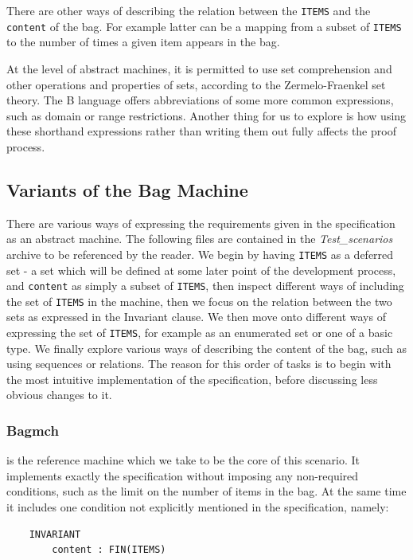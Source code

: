 \documentclass[11pt,journal]{IEEEtran}
\begin{document}
	There are other ways of describing the relation between the \texttt{ITEMS} and the \texttt{content} of the bag. For example latter can be a mapping from a subset of \texttt{ITEMS} to the number of times a given item appears in the bag.
	
	At the level of abstract machines, it is permitted to use set comprehension and other operations and properties of sets, according to the Zermelo-Fraenkel set theory. The B language offers abbreviations of some more common expressions, such as domain or range restrictions. Another thing for us to explore is how using these shorthand expressions rather than writing them out fully affects the proof process.

	\subsection{Variants of the Bag Machine}
	There are various ways of expressing the requirements given in the specification as an abstract machine. The following files are contained in the \emph{Test\_scenarios} archive to be referenced by the reader. We begin by having \texttt{ITEMS} as a deferred set - a set which will be defined at some later point of the development process, and \texttt{content} as simply a subset of \texttt{ITEMS}, then inspect different ways of including the set of \texttt{ITEMS} in the machine, then we focus on the relation between the two sets as expressed in the Invariant clause. We then move onto different ways of expressing the set of \texttt{ITEMS}, for example as an enumerated set or one of a basic type. We finally explore various ways of describing the content of the bag, such as using sequences or relations. The reason for this order of tasks is to begin with the most intuitive implementation of the specification, before discussing less obvious changes to it.
	
	\subsubsection{Bagmch} is the reference machine which we take to be the core of this scenario. It implements exactly the specification without imposing any non-required conditions, such as the limit on the number of items in the bag. At the same time it includes one condition not explicitly mentioned in the specification, namely:
	\begin{lstlisting}
	INVARIANT
		content : FIN(ITEMS)
	\end{lstlisting}
\end{document}
